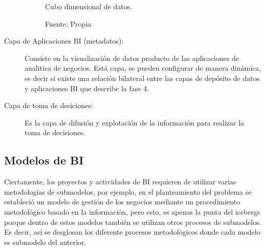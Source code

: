 \documentclass[12pt,jou]{apa7}
\begin{document}
\begin{description}
\begin{figure}[h]
\caption{Cubo dimensional de datos.}
\centering
{}
\caption*{ Fuente: Propia} \label{fig: cubo}	
\end{figure}
	
\item[Capa de Aplicaciones BI (metadatos):] Consiste en la visualización de datos producto de las aplicaciones de analitica de negocios. Está capa, se pueden configurar de manera dinámica, es decir si existe una relación bilateral entre las capas de depósito de datos y aplicaciones BI que describe la fase 4.
	
\item[Capa de toma de desiciones:] Es la capa de difusión y explotación de la información para realizar la toma de decisiones.
\end{description}

\subsection{Modelos de BI}
Ciertamente, los proyectos y actividades de BI requieren de utilizar varias metodologías de submodelos, por ejemplo, en el planteamiento del problema se estableció un modelo de gestión de los negocios mediante un procedimiento metodológico basado en la información, pero esto, es apenas la punta del icebergs porque dentro de estos modelos también se utilizan otros procesos de submodelos. Es decir, así se desglosan los diferente procesos metodológicos donde cada modelo es submodelo del anterior.
\end{document}
